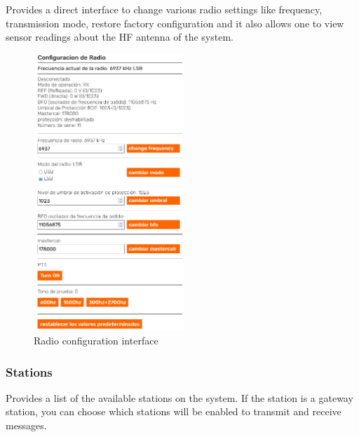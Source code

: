 \documentclass[11pt,a4paper]{article}
\begin{document}
Provides a direct interface to change various radio settings like frequency, transmission mode, restore factory configuration and it also allows one to view sensor readings about the HF antenna of the system. %

\begin{figure}[H]
    \centering
    \includegraphics[width=0.5\textwidth]{screenshots/frontend/es/radioconfig.png}
    \caption{Radio configuration interface}
	\vspace{-10pt}
    \label{fig:radioconf}
\end{figure}    


\subsubsection{Stations} 
\label{gui_stations}

Provides a list of the available stations on the system. If the station is a gateway station, you can choose which stations will be enabled to transmit and receive messages.
\end{document}
